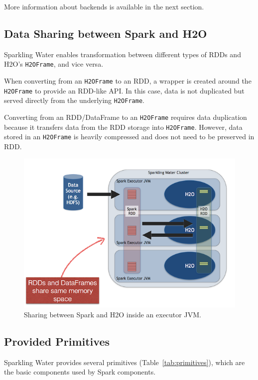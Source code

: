 \documentclass{standalone}
\begin{document}
More information about backends is available in the next section.

\subsection{Data Sharing between Spark and H2O}

Sparkling Water enables transformation between different types of RDDs and H2O's \texttt{H2OFrame}, and vice versa.

When converting from an \texttt{H2OFrame} to an RDD, a wrapper is created around the \texttt{H2OFrame} to provide an RDD-like API. In this case,  data is not duplicated but served directly from the underlying \texttt{H2OFrame}.

Converting from an RDD/DataFrame to an \texttt{H2OFrame} requires data duplication because it transfers data from the RDD storage into \texttt{H2OFrame}. However, data stored in an \texttt{H2OFrame} is heavily compressed and does not need to be preserved in RDD.

\begin{figure}[h!]
	\centering
	\includegraphics[scale=1]{../images/DataShare.png}
	\caption{Sharing between Spark and H2O inside an executor JVM.}
\end{figure}

\subsection{Provided Primitives}

Sparkling Water provides several primitives (Table~\ref{tab:primitives}), which are the basic components used by Spark components.
\end{document}
